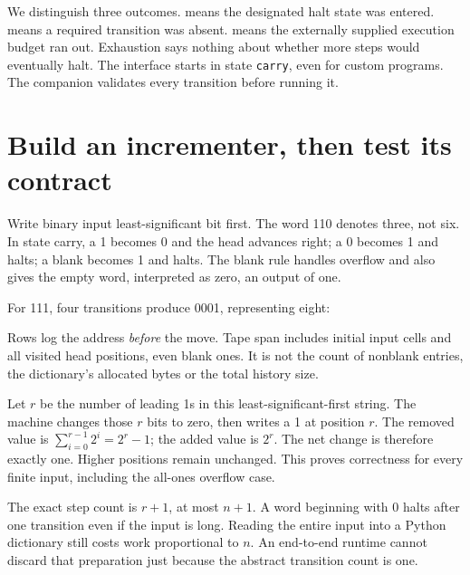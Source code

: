 We distinguish three outcomes.  means the designated halt state
was entered.  means a required transition was absent.
 means the externally supplied execution budget ran out.
Exhaustion says nothing about whether more steps would eventually halt.
The interface starts in state \texttt{carry}, even for custom programs.
The companion validates every transition before running it.

\section{Build an incrementer, then test its contract}
Write binary input least-significant bit first. The word 110 denotes three,
not six. In state carry, a 1 becomes 0 and the head advances right; a 0
becomes 1 and halts; a blank becomes 1 and halts. The blank rule handles
overflow and also gives the empty word, interpreted as zero, an output of one.


For 111, four transitions produce 0001, representing eight:
\begin{center}\end{center}
Rows log the address \emph{before} the move. Tape span includes initial input
cells and all visited head positions, even blank ones. It is not the count of
nonblank entries, the dictionary's allocated bytes or the total history size.

Let $r$ be the number of leading 1s in this least-significant-first string.
The machine changes those $r$ bits to zero, then writes a 1 at position $r$.
The removed value is $\sum_{i=0}^{r-1}2^i=2^r-1$; the added value is
$2^r$. The net change is therefore exactly one. Higher positions remain
unchanged. This proves correctness for every finite input, including the
all-ones overflow case.


The exact step count is $r+1$, at most $n+1$. A word beginning with 0
halts after one transition even if the input is long. Reading the entire
input into a Python dictionary still costs work proportional to $n$.
An end-to-end runtime cannot discard that preparation just because the
abstract transition count is one.

